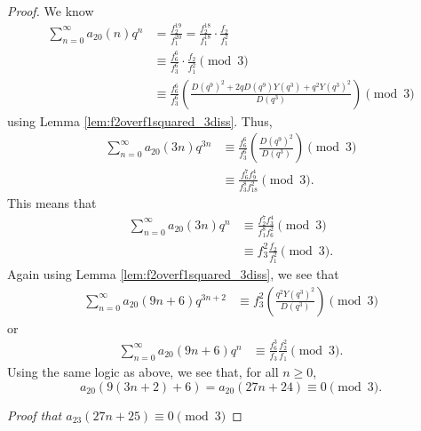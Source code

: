 \documentclass[10pt, reqno]{amsart}
\theoremstyle{theorem}
\theoremstyle{definition}
\theoremstyle{example}
\begin{document}
\begin{proof}
\noindent 
We know 
\begin{align*}
\sum_{n=0}^\infty a_{20}(n)q^n 
&= 
\frac{f_2^{19}}{f_1^{20}} = 
\frac{f_2^{18}}{f_1^{18}}\cdot \frac{f_2}{f_1^2} \\
&\equiv 
\frac{f_{6}^6}{f_3^6}\cdot \frac{f_2}{f_1^2} \pmod{3}  \\
&\equiv 
\frac{f_6^6}{f_3^6}\left( \frac{D(q^9)^2 +2qD(q^9)Y(q^3)+q^2Y(q^3)^2}{D(q^3)}  \right) \pmod{3} 
\end{align*}
using Lemma \ref{lem:f2overf1squared_3diss}.  
Thus, 
\begin{align*}
\sum_{n=0}^\infty a_{20}(3n)q^{3n} 
&\equiv 
\frac{f_6^6}{f_3^6}\left( \frac{D(q^9)^2}{D(q^3)} \right) \pmod{3}  \\
&\equiv 
\frac{f_6^7f_{9}^4}{f_3^8f_{18}^2} \pmod{3}.
\end{align*}
This means that
\begin{align*}
\sum_{n=0}^\infty a_{20}(3n)q^{n} 
&\equiv 
\frac{f_2^7f_{3}^4}{f_1^8f_{6}^2} \pmod{3} \\
&\equiv 
f_3^2\frac{f_2}{f_1^2} \pmod{3}.
\end{align*}
Again using Lemma \ref{lem:f2overf1squared_3diss}, we see that 
\begin{align*}
\sum_{n=0}^\infty a_{20}(9n+6)q^{3n+2} 
&\equiv 
f_3^2 \left( \frac{q^2Y(q^3)^2}{D(q^3)} \right) \pmod{3}
\end{align*}
or 
\begin{align*}
\sum_{n=0}^\infty a_{20}(9n+6)q^{n} 
&\equiv 
\frac{f_6^3}{f_3}\frac{f_2^2}{f_1} \pmod{3}.
\end{align*}
Using the same logic as above, we see that, for all $n\geq 0$, 
\begin{equation*}
a_{20}(9(3n+2)+6) = a_{20}(27n+24) \equiv 0 \pmod{3}. 
\end{equation*}


\bigskip  

\noindent
{\it Proof that $a_{23}(27n+25) \equiv 0 \pmod{3}$}

\bigskip 


\end{proof}
\end{document}
